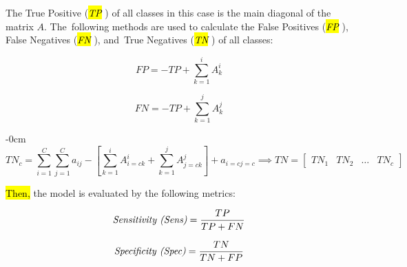 \documentclass[sensors,article,accept,pdftex,moreauthors]{Definitions/mdpi}
\begin{document}
	The True Positive (\hl{\textit{TP}}%
) of all classes in this case is the main diagonal of the matrix $A$. The~following methods are used to calculate the False Positives (\hl{\textit{FP}}%
), False Negatives (\hl{\textit{FN}}%
), and~True Negatives (\hl{\textit{TN}}%
) of all classes:
	
	\begin{equation}
		\label{eqn:FP}
		FP = -TP + \sum_{k=1}^{i}A^i_k
	\end{equation}
	
	\begin{equation}
		\label{eqn:FN}
		FN = -TP + \sum_{k=1}^{j}A^j_k
	\end{equation}
	

\begin{adjustwidth}{-\extralength}{0cm}
	\begin{equation}
		\label{eqn:TN}
		TN_c = \sum_{i=1}^{C}\sum_{j=1}^{C}a_{ij} - \left[ \sum_{k=1}^{i}A^i_{i=c k} + \sum_{k=1}^{j}A^j_{j=c k} \right] + a_{i=c j=c} \implies TN = \begin{bmatrix}
TN_1 & TN_2 & \dots & TN_c
		\end{bmatrix}
	\end{equation}
\end{adjustwidth}
	
	\hl{Then,} %
 the model is evaluated by the following metrics:
	
	\begin{equation}
		\label{eqn:sens}
		\text{\textit{Sensitivity (Sens)}} = \frac{TP}{TP + FN}
	\end{equation}
	
	\begin{equation}
		\label{eqn:spec}
		\text{\textit{Specificity (Spec)}} = \frac{TN}{TN + FP}
	\end{equation}
	
\end{document}
